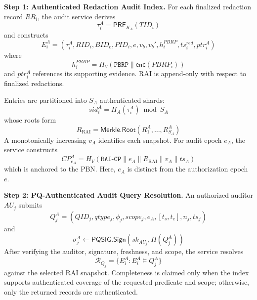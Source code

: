 \documentclass[lettersize,journal]{IEEEtran}
\begin{document}
\medskip
\noindent\textbf{Step 1: Authenticated Redaction Audit Index.}
For each finalized redaction record $RR_i$, the audit service derives
\begin{equation}
\tau_i^A=\mathsf{PRF}_{K_A}(TID_i)
\end{equation}
and constructs
\begin{equation}
E_i^A=
(\tau_i^A,RID_i,BID_e,PID_i,e,v_b,v_b',
h_i^{PBRP},ts_i^{red},ptr_i^A)
\end{equation}
where
\begin{equation}
h_i^{PBRP}
=
H_V(\texttt{PBRP}\parallel\mathsf{enc}(PBRP_i))
\end{equation}
and $ptr_i^A$ references its supporting evidence. RAI is append-only
with respect to finalized redactions.

Entries are partitioned into $S_A$ authenticated shards:
\begin{equation}
sid_i^A=H_A(\tau_i^A)\bmod S_A
\end{equation}
whose roots form
\begin{equation}
R_{\mathrm{RAI}}
=
\mathsf{Merkle.Root}(R_1^A,\ldots,R_{S_A}^A)
\end{equation}
A monotonically increasing $v_A$ identifies each snapshot. For audit
epoch $e_A$, the service constructs
\begin{equation}
CP_{e_A}^A
=
H_V(
\texttt{RAI-CP}\parallel e_A\parallel
R_{\mathrm{RAI}}\parallel v_A\parallel ts_A)
\label{eq:rai_cp}
\end{equation}
which is anchored to the PBN. Here, $e_A$ is distinct from the
authorization epoch $e$.

\medskip
\noindent\textbf{Step 2: PQ-Authenticated Audit Query Resolution.}
An authorized auditor $AU_j$ submits
\begin{equation}
Q_j^A=
(QID_j,qtype_j,\phi_j,scope_j,e_A,[t_s,t_e],n_j,ts_j)
\end{equation}
and
\begin{equation}
\sigma_j^A
\leftarrow
\mathsf{PQSIG.Sign}(sk_{AU_j},H(Q_j^A))
\end{equation}
After verifying the auditor, signature, freshness, and scope, the
service resolves
\begin{equation}
\mathcal{R}_{Q_j}
=
\{E_i^A:E_i^A\models Q_j^A\}
\end{equation}
against the selected RAI snapshot. Completeness is claimed only when
the index supports authenticated coverage of the requested predicate
and scope; otherwise, only the returned records are authenticated.
\end{document}
